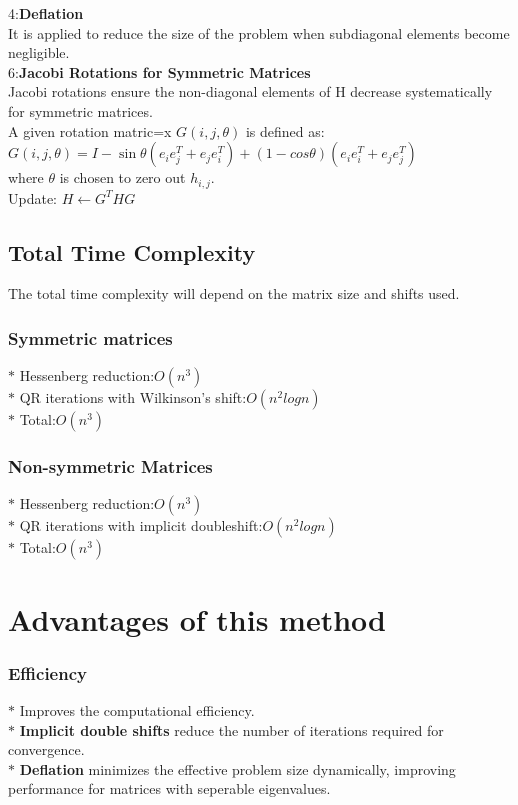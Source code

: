 \documentclass[a4paper,12pt]{article}
\begin{document}
4:\textbf{Deflation}\\
It is applied to reduce the size of the problem when subdiagonal elements become negligible.\\
6:\textbf{Jacobi Rotations for Symmetric Matrices}\\
 Jacobi rotations ensure the non-diagonal elements of H decrease systematically for symmetric matrices.\\
 A given rotation matric=x $G(i,j,\theta)$ is defined as: \\
 $G(i,j,\theta)= I- \sin\theta(e_ie_j^T+e_je_i^T) +(1-cos\theta)(e_ie_i^T+e_je_j^T)$\\
 where $\theta$ is chosen to zero out $h_{i,j}$.\\
 Update: $H\leftarrow G^THG$\\
 \subsection{Total Time Complexity}
 The total time complexity will depend on the matrix size and shifts used.\\
 \subsubsection{Symmetric matrices}
 $*$ Hessenberg reduction:$O(n^3)$\\
 $*$ QR iterations with Wilkinson's shift:$O(n^2logn)$\\
 $*$ Total:$O(n^3)$\\
 \subsubsection{Non-symmetric Matrices}
$*$ Hessenberg reduction:$O(n^3)$\\
 $*$ QR iterations with implicit doubleshift:$O(n^2logn)$\\
 $*$ Total:$O(n^3)$\\
 \section{Advantages of this method}
 \subsubsection{Efficiency}
 
 $*$ Improves the computational efficiency.\\
 $*$ \textbf{Implicit double shifts} reduce the number of iterations required for convergence.\\
 $*$\textbf{ Deflation} minimizes the effective problem size dynamically, improving performance for matrices with seperable eigenvalues.
\end{document}
